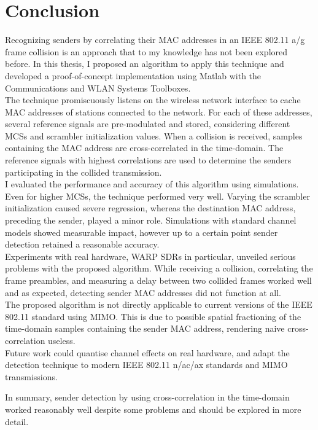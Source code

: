 
\chapter{Conclusion}\label{ch:Conclusion}
\glsresetall %

Recognizing senders by correlating their MAC addresses in an IEEE 802.11 a/g frame collision is an approach that to my knowledge has not been explored before. In this thesis, I proposed an algorithm to apply this technique and developed a proof-of-concept implementation using Matlab with the Communications and WLAN Systems Toolboxes.\\

The technique promiscuously listens on the wireless network interface to cache MAC addresses of stations connected to the network. For each of these addresses, several reference signals are pre-modulated and stored, considering different \glspl{MCS} and scrambler initialization values. When a collision is received, samples containing the MAC address are cross-correlated in the time-domain. The reference signals with highest correlations are used to determine the senders participating in the collided transmission.\\

I evaluated the performance and accuracy of this algorithm using simulations. Even for higher \glspl{MCS}, the technique performed very well. Varying the scrambler initialization caused severe regression, whereas the destination MAC address, preceding the sender, played a minor role. Simulations with standard channel models showed measurable impact, however up to a certain point sender detection retained a reasonable accuracy.\\

Experiments with real hardware, \gls{WARP} \glspl{SDR} in particular, unveiled serious problems with the proposed algorithm. While receiving a collision, correlating the frame preambles, and measuring a delay between two collided frames worked well and as expected, detecting sender MAC addresses did not function at all.\\

The proposed algorithm is not directly applicable to current versions of the IEEE 802.11 standard using \gls{MIMO}. This is due to possible spatial fractioning of the time-domain samples containing the sender MAC address, rendering naive cross-correlation useless.\\

Future work could quantise channel effects on real hardware, and adapt the detection technique to modern IEEE 802.11 n/ac/ax standards and \gls{MIMO} transmissions.

In summary, sender detection by using cross-correlation in the time-domain worked reasonably well despite some problems and should be explored in more detail.
